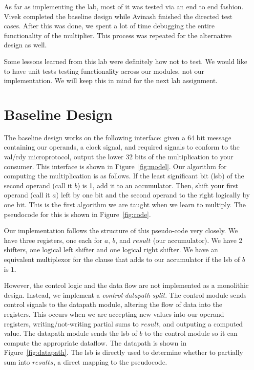 \documentclass[11pt]{article}
\begin{document}
As far as implementing the lab, most of it was tested via an end to end fashion.
Vivek completed the baseline design while Avinash finished the directed test cases.
After this was done, we spent a lot of time debugging the entire functionality of the multiplier.
This process was repeated for the alternative design as well.

Some lessons learned from this lab were definitely how not to test.
We would like to have unit tests testing functionality across our modules, not our implementation.
We will keep this in mind for the next lab assignment.

\section{Baseline Design}

The baseline design works on the following interface: 
given a 64 bit message containing our operands, a clock signal,
and required signals to conform to the val/rdy microprotocol,
output the lower 32 bits of the multiplication to your consumer.
This interface is shown in Figure~\ref{fig:model}.
Our algorithm for computing the multiplication is as follows.
If the least significant bit (lsb) of the second operand (call it $b$) is 1, add it to an accumulator.
Then, shift your first operand (call it $a$) left by one bit and the second operand to the right logically by one bit.
This is the first algorithm we are taught when we learn to multiply.
The pseudocode for this is shown in Figure~\ref{fig:code}. 

Our implementation follows the structure of this pseudo-code very closely.
We have three registers, one each for $a$, $b$, and $result$ (our accumulator).
We have 2 shifters, one logical left shifter and one logical right shifter. 
We have an equivalent multiplexor for the clause that adds to our accumulator if the lsb of $b$ is $1$.

However, the control logic and the data flow are not implemented as a monolithic design.
Instead, we implement a \textit{control-datapath split.}
The control module sends control signals to the datapath module, altering the flow of data into the registers.
This occurs when we are accepting new values into our operand registers,
writing/not-writing partial sums to $result$, and outputing a computed value.
The datapath module sends the lsb of $b$ to the control module so it can compute the appropriate dataflow.
The datapath is shown in Figure~\ref{fig:datapath}.
The lsb is directly used to determine whether to partially sum into $results$, a direct mapping to the pseudocode.
\end{document}
